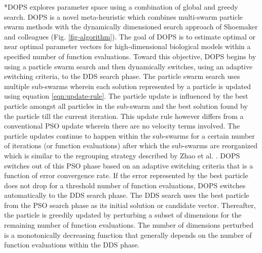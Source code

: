 \documentclass[12pt]{article}
\makeatletter
\renewcommand\subsection{\@startsection
	{subsection}{2}{0mm}
	{-0.05in}
	{-0.5\baselineskip}
	{\normalfont\normalsize\bfseries}}
\makeatother
\begin{document}
\subsection*{DOPS explores parameter space using a combination of global and greedy search.}
DOPS is a novel meta-heuristic which combines multi-swarm particle swarm methods with the dynamically dimensioned search approach of Shoemaker and colleagues (Fig. \ref{fig-algorithm}).
The goal of DOPS is to estimate optimal or near optimal parameter vectors for high-dimensional biological models within a specified number of function evaluations.
Toward this objective, DOPS begins by using a particle swarm search and then dynamically switches, using an adaptive switching criteria, to the DDS search phase.
The particle swarm search uses multiple sub-swarms wherein each solution represented by a particle is updated using equation \ref{eqn:update-rule}. The particle update is influenced by the best particle amongst all particles in the sub-swarm and the best solution found by the particle till the current iteration. This update rule however differs from a conventional PSO update wherein there are no velocity terms involved. The particle updates continue to happen within the sub-swarms for a certain number of iterations (or function evaluations) after which the sub-swarms are reorganized which is similar to the regrouping strategy described by Zhao et al. \cite{zhao2008dynamic}. DOPS switches out of this PSO phase based on an adaptive switching criteria that is a function of error convergence rate. If the error represented by the best particle does not drop for a threshold number of function evaluations, DOPS switches automatically to the DDS search phase. The DDS search uses the best particle from the PSO search phase as its initial solution or candidate vector. Thereafter, the particle is greedily updated by perturbing a subset of dimensions for the remaining number of function evaluations. The number of dimensions perturbed is a monotonically decreasing function that generally depends on the number of function evaluations within the DDS phase.  
\end{document}

